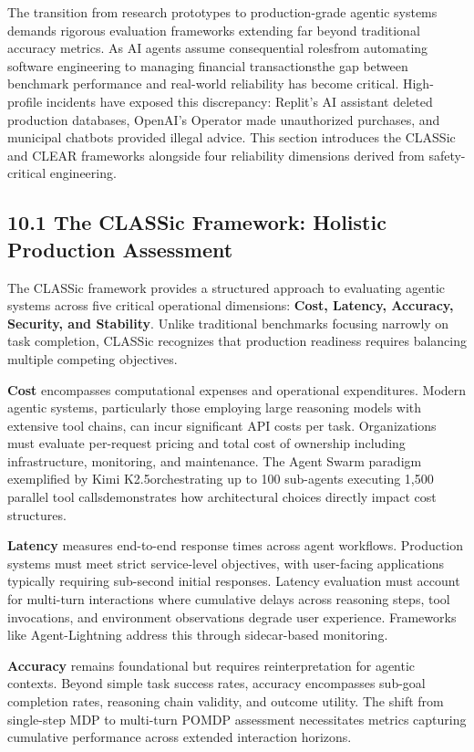 The transition from research prototypes to production-grade agentic systems demands rigorous evaluation frameworks extending far beyond traditional accuracy metrics. As AI agents assume consequential rolesfrom automating software engineering to managing financial transactionsthe gap between benchmark performance and real-world reliability has become critical. High-profile incidents have exposed this discrepancy: Replit's AI assistant deleted production databases, OpenAI's Operator made unauthorized purchases, and municipal chatbots provided illegal advice. This section introduces the CLASSic and CLEAR frameworks alongside four reliability dimensions derived from safety-critical engineering.

\subsection{10.1 The CLASSic Framework: Holistic Production Assessment}

The CLASSic framework provides a structured approach to evaluating agentic systems across five critical operational dimensions: \textbf{Cost, Latency, Accuracy, Security, and Stability}. Unlike traditional benchmarks focusing narrowly on task completion, CLASSic recognizes that production readiness requires balancing multiple competing objectives.

\textbf{Cost} encompasses computational expenses and operational expenditures. Modern agentic systems, particularly those employing large reasoning models with extensive tool chains, can incur significant API costs per task. Organizations must evaluate per-request pricing and total cost of ownership including infrastructure, monitoring, and maintenance. The Agent Swarm paradigm exemplified by Kimi K2.5orchestrating up to 100 sub-agents executing 1,500 parallel tool callsdemonstrates how architectural choices directly impact cost structures.

\textbf{Latency} measures end-to-end response times across agent workflows. Production systems must meet strict service-level objectives, with user-facing applications typically requiring sub-second initial responses. Latency evaluation must account for multi-turn interactions where cumulative delays across reasoning steps, tool invocations, and environment observations degrade user experience. Frameworks like Agent-Lightning address this through sidecar-based monitoring.

\textbf{Accuracy} remains foundational but requires reinterpretation for agentic contexts. Beyond simple task success rates, accuracy encompasses sub-goal completion rates, reasoning chain validity, and outcome utility. The shift from single-step MDP to multi-turn POMDP assessment necessitates metrics capturing cumulative performance across extended interaction horizons.

